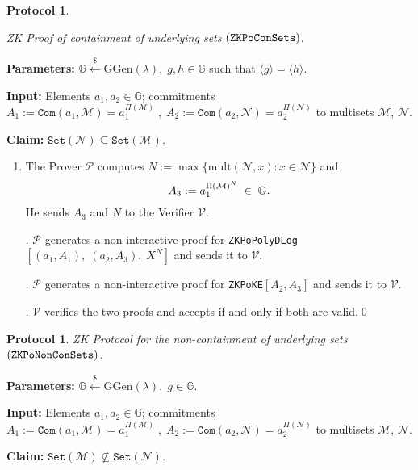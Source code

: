 \documentclass[11pt, lettersize, notitlepage, leqno, footskip=0.6cm]{article}
\newcommand{\ttt}{\texttt}
\newcommand{\bG}{\mathbb{G}}
\newcommand{\sett}{\ttt{Set}}
\newcommand{\la}{\langle}
\newcommand{\ra}{\rangle}
\newcommand{\mc}{\mathcal}
\newcommand{\mb}{\mathbb}
\newcommand{\mr}{\mathrm}
\newcommand{\lamb}{\lambda}
\newcommand{\sub}{\subseteq}
\newcommand{\nsub}{\nsubseteq}
\newcommand{\mP}{\mc{P}}
\newcommand{\V}{\mc{V}}
\newcommand{\vs}{\vspace{-0.15cm}}
\newcommand{\noin}{\noindent}
\newtheorem{Prot}[Thm]{Protocol}
\numberwithin{equation}{section}
\begin{document}
\begin{Prot} \hypertarget{Sets}{ZK Proof of containment of underlying sets $(\tt{ZKPoConSets})$.}\end{Prot} \vspace{-0.3cm}

\noin \textbf{Parameters:} $\mb{G}\xleftarrow{\$} \mr{GGen}(\lamb), \; g, h\in \mb{G}$ such that $\la g \ra = \la h \ra$.

\noin \textbf{Input:} Elements $a_1,a_2\in\mb{G}$; commitments $A_1 := \ttt{Com}(a_1, \mc{M}) = a_1^{\Pi(\mc{M})}\;,\;A_2 := \ttt{Com}(a_2, \mc{N})= a_2^{\Pi(\mc{N})}$ to multisets $\mc{M}$, $\mc{N}$.

\noin \textbf{Claim:} $\sett(\mc{N})\sub \sett(\mc{M})$. \vs

\begin{enumerate}[wide, labelwidth=!, labelindent=0pt] \item The Prover $\mP$ computes $N:= \max\{\mr{mult}(\mc{N}, x):x \in \mc{N}\}$ and \vs $$A_3:= a_1^{\Pi(\mc{M})^N}\;\in\;\bG. \vs $$ He sends $A_3$ and $N$ to the Verifier $\V$.

\noin 2. $\mP$ generates a non-interactive proof for \verb|ZKPoPolyDLog|$[(a_1, A_1),\;(a_2, A_3),\;X^N]$ and sends it to $\V$.

\noin 3. $\mP$ generates a non-interactive proof for \verb|ZKPoKE|$[A_2,A_3]$ and sends it to $\V$.

\noin 4. $\V$ verifies the two proofs and accepts if and only if both are valid.\qed \end{enumerate}


\begin{Prot} ZK Protocol for the non-containment of underlying sets $(\tt{ZKPoNonConSets})$.\end{Prot}\vspace{-0.3cm}

\noin \textbf{Parameters:} $\mb{G}\xleftarrow{\$} \mr{GGen}(\lamb), \; g\in \mb{G}$. 

\noin \textbf{Input:} Elements $a_1,a_2\in\mb{G}$; commitments $A_1 := \ttt{Com}(a_1, \mc{M}) = a_1^{\Pi(\mc{M})}\;,\;A_2 := \ttt{Com}(a_2, \mc{N})= a_2^{\Pi(\mc{N})}$ to multisets $\mc{M}$, $\mc{N}$.

\noin \textbf{Claim:} $\sett(\mc{M})\nsub \sett(\mc{N})$. \vs
\end{document}
